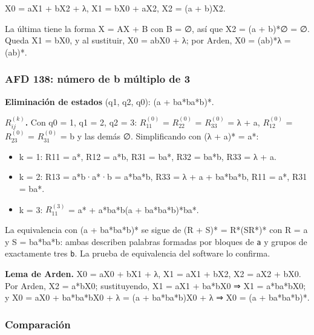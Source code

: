 X0 = aX1 + bX2 + λ, X1 = bX0 + aX2, X2 = (a + b)X2.

La última tiene la forma X = AX + B con B = ∅, así que X2 = (a + b)*∅ = ∅. Queda X1 = bX0, y al sustituir, X0 = abX0 + λ; por Arden, X0 = (ab)*λ = (ab)*.

\hypertarget{afd-138-nuxfamero-de-b-muxfaltiplo-de-3}{%
\subsubsection{AFD 138: número de b múltiplo de 3}\label{afd-138-nuxfamero-de-b-muxfaltiplo-de-3}}

\textbf{Eliminación de estados} (q1, q2, q0): (a + ba*ba*b)*.

\textbf{\(R_{ij}^{(k)}\).} Con q0 = 1, q1 = 2, q2 = 3: \(R_{11}^{(0)}\) = \(R_{22}^{(0)}\) = \(R_{33}^{(0)}\) = λ + a, \(R_{12}^{(0)}\) = \(R_{23}^{(0)}\) = \(R_{31}^{(0)}\) = b y las demás ∅. Simplificando con (λ + a)* = a*:

\begin{itemize}
\tightlist
\item
  k = 1: R11 = a*, R12 = a*b, R31 = ba*, R32 = ba*b, R33 = λ + a.
\item
  k = 2: R13 = a*b·a*·b = a*ba*b, R33 = λ + a + ba*ba*b, R11 = a*, R31 = ba*.
\item
  k = 3: \(R_{11}^{(3)}\) = a* + a*ba*b(a + ba*ba*b)*ba*.
\end{itemize}

La equivalencia con (a + ba*ba*b)* se sigue de (R + S)* = R*(SR*)* con R = a y S = ba*ba*b: ambas describen palabras formadas por bloques de \texttt{a} y grupos de exactamente tres \texttt{b}. La prueba de equivalencia del software lo confirma.

\textbf{Lema de Arden.} X0 = aX0 + bX1 + λ, X1 = aX1 + bX2, X2 = aX2 + bX0. Por Arden, X2 = a*bX0; sustituyendo, X1 = aX1 + ba*bX0 ⇒ X1 = a*ba*bX0; y X0 = aX0 + ba*ba*bX0 + λ = (a + ba*ba*b)X0 + λ ⇒ X0 = (a + ba*ba*b)*.

\hypertarget{comparaciuxf3n}{%
\subsubsection{Comparación}\label{comparaciuxf3n}}

